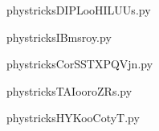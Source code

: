    

    \clearpage
    


    \newcommand{\CaptionFigDIPLooHILUUs}{<+Type your caption here+>}
    \begin{center}
        
    \end{center}
    phystricksDIPLooHILUUs.py

    

    \clearpage
    


    \newcommand{\CaptionFigIBmsroy}{<+Type your caption here+>}
    \begin{center}
        
    \end{center}
    phystricksIBmsroy.py

    

    \clearpage
    


    \newcommand{\CaptionFigCorSSTXPQVjn}{<+Type your caption here+>}
    \begin{center}
        
    \end{center}
    phystricksCorSSTXPQVjn.py

    

    \clearpage
    


    \newcommand{\CaptionFigTAIooroZRs}{<+Type your caption here+>}
    \begin{center}
        
    \end{center}
    phystricksTAIooroZRs.py

    

    \clearpage
    


    \newcommand{\CaptionFigHYKooCotyT}{<+Type your caption here+>}
    \begin{center}
        
    \end{center}
    phystricksHYKooCotyT.py

    

    \clearpage
    


